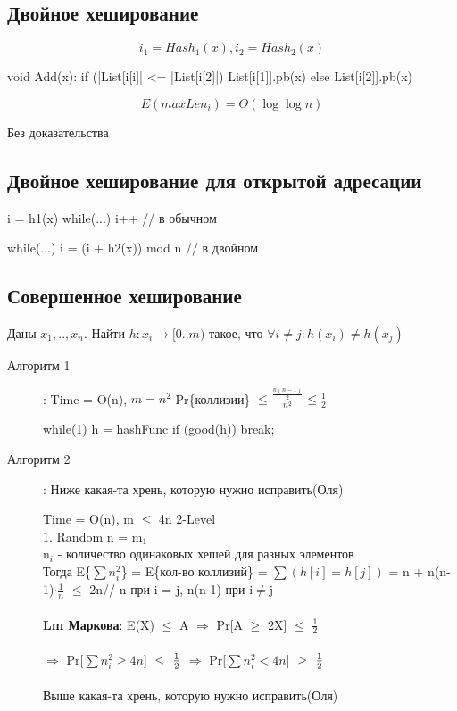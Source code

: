 \subsection{Двойное хеширование}
$$i_1 = Hash_1(x), i_2 = Hash_2(x)$$
\begin{cppcode}
void Add(x):
    if (|List[i[i]| <= |List[i[2]|) {
        List[i[1]].pb(x)
    } else {
        List[i[2]].pb(x)
    }
\end{cppcode}

\begin{lemma}{}
 $$E(max Len_i) = \Theta(\log \log n)$$
 
 Без доказательства
\end{lemma}


\subsection{Двойное хеширование для открытой адресации}

\begin{cppcode}
i = h1(x)
while(...) i++  // в обычном 

while(...) i = (i + h2(x)) mod n // в двойном
\end{cppcode}

\subsection{Совершенное хеширование} 

Даны $x_1,..,x_n$. Найти $h\colon x_i\rightarrow [0..m)$ такое, что  $\forall i \neq j\colon h(x_i) \neq h(x_j)$
\begin{description}
\item[Алгоритм 1]: Time = O(n), $m = n^2$
Pr\{коллизии\} $\le \frac{\frac{n(n-1)}{2}}{n^2} \le \frac{1}{2}$

\begin{cppcode}
while(1) {
    h = hashFunc
    if (good(h)) {
        break;
    }
}
\end{cppcode}

\item[Алгоритм 2]: 
{\Large \color{red} Ниже какая-та хрень, которую нужно исправить(Оля)}

Time  = O(n), m $\le$ 4n
2-Level\\
1. Random n = m$_1$\\
n$_i$ - количество одинаковых хешей для разных элементов\\
Тогда E\{$\sum n_i^2$\} = E\{кол-во коллизий\} = $\sum(h[i] = h[j])$ = n + n(n-1)$\cdot \frac{1}{n}$ $\le$ 2n// n при i = j, n(n-1) при i$\neq$j \\\\
\textbf{Lm Маркова}: E(X) $\le$ A $\Rightarrow$ Pr[A $\ge$ 2X] $\le$ $\frac{1}{2}$\\\\
$\Rightarrow$ Pr[$\sum n_i^2 \ge 4n$] $\le$ $1\over{2}$ $\Rightarrow$ Pr[$\sum n_i^2 < 4n$] $\ge$ $1\over{2}$\\\\

{\Large \color{red} Выше какая-та хрень, которую нужно исправить(Оля)}

\end{description} 


